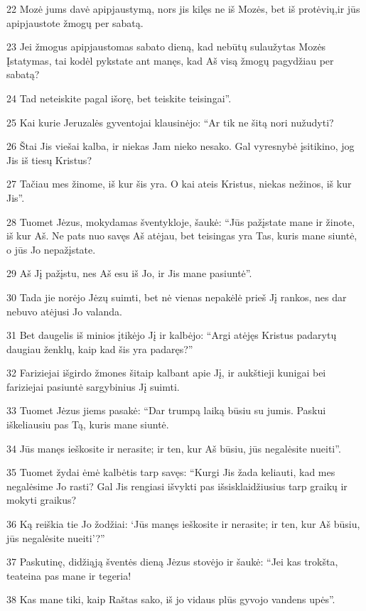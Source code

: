 \par 22 Mozė jums davė apipjaustymą,­ nors jis kilęs ne iš Mozės, bet iš protėvių,­ir jūs apipjaustote žmogų per sabatą. 
\par 23 Jei žmogus apipjaustomas sabato dieną, kad nebūtų sulaužytas Mozės Įstatymas, tai kodėl pykstate ant manęs, kad Aš visą žmogų pagydžiau per sabatą? 
\par 24 Tad neteiskite pagal išorę, bet teiskite teisingai”. 
\par 25 Kai kurie Jeruzalės gyventojai klausinėjo: “Ar tik ne šitą nori nužudyti? 
\par 26 Štai Jis viešai kalba, ir niekas Jam nieko nesako. Gal vyresnybė įsitikino, jog Jis iš tiesų Kristus? 
\par 27 Tačiau mes žinome, iš kur šis yra. O kai ateis Kristus, niekas nežinos, iš kur Jis”. 
\par 28 Tuomet Jėzus, mokydamas šventykloje, šaukė: “Jūs pažįstate mane ir žinote, iš kur Aš. Ne pats nuo savęs Aš atėjau, bet teisingas yra Tas, kuris mane siuntė, o jūs Jo nepažįstate. 
\par 29 Aš Jį pažįstu, nes Aš esu iš Jo, ir Jis mane pasiuntė”. 
\par 30 Tada jie norėjo Jėzų suimti, bet nė vienas nepakėlė prieš Jį rankos, nes dar nebuvo atėjusi Jo valanda. 
\par 31 Bet daugelis iš minios įtikėjo Jį ir kalbėjo: “Argi atėjęs Kristus padarytų daugiau ženklų, kaip kad šis yra padaręs?” 
\par 32 Fariziejai išgirdo žmones šitaip kalbant apie Jį, ir aukštieji kunigai bei fariziejai pasiuntė sargybinius Jį suimti. 
\par 33 Tuomet Jėzus jiems pasakė: “Dar trumpą laiką būsiu su jumis. Paskui iškeliausiu pas Tą, kuris mane siuntė. 
\par 34 Jūs manęs ieškosite ir nerasite; ir ten, kur Aš būsiu, jūs negalėsite nueiti”. 
\par 35 Tuomet žydai ėmė kalbėtis tarp savęs: “Kurgi Jis žada keliauti, kad mes negalėsime Jo rasti? Gal Jis rengiasi išvykti pas išsisklaidžiusius tarp graikų ir mokyti graikus? 
\par 36 Ką reiškia tie Jo žodžiai: ‘Jūs manęs ieškosite ir nerasite; ir ten, kur Aš būsiu, jūs negalėsite nueiti’?” 
\par 37 Paskutinę, didžiąją šventės dieną Jėzus stovėjo ir šaukė: “Jei kas trokšta, teateina pas mane ir tegeria! 
\par 38 Kas mane tiki, kaip Raštas sako, iš jo vidaus plūs gyvojo vandens upės”. 
